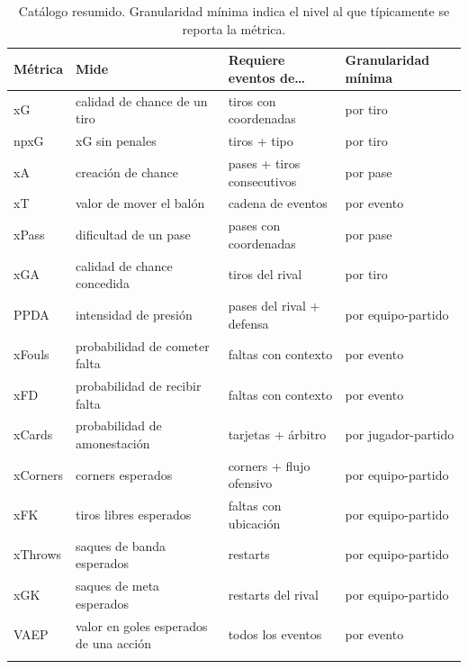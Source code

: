 \begin{longtable}{lp{5.5cm}p{4cm}p{2.5cm}}
\toprule
\textbf{Métrica} & \textbf{Mide} & \textbf{Requiere eventos de\ldots} & \textbf{Granularidad mínima} \\
\midrule
\endhead
xG       & calidad de chance de un tiro             & tiros con coordenadas      & por tiro \\
npxG     & xG sin penales                            & tiros + tipo               & por tiro \\
xA       & creación de chance                        & pases + tiros consecutivos & por pase \\
xT       & valor de mover el balón                   & cadena de eventos          & por evento \\
xPass    & dificultad de un pase                     & pases con coordenadas      & por pase \\
xGA      & calidad de chance concedida               & tiros del rival            & por tiro \\
PPDA     & intensidad de presión                     & pases del rival + defensa  & por equipo-partido \\
xFouls   & probabilidad de cometer falta             & faltas con contexto        & por evento \\
xFD      & probabilidad de recibir falta             & faltas con contexto        & por evento \\
xCards   & probabilidad de amonestación              & tarjetas + árbitro         & por jugador-partido \\
xCorners & corners esperados                         & corners + flujo ofensivo   & por equipo-partido \\
xFK      & tiros libres esperados                    & faltas con ubicación       & por equipo-partido \\
xThrows  & saques de banda esperados                 & restarts                   & por equipo-partido \\
xGK      & saques de meta esperados                  & restarts del rival         & por equipo-partido \\
VAEP     & valor en goles esperados de una acción   & todos los eventos          & por evento \\
\bottomrule
\caption{Catálogo resumido. Granularidad mínima indica el nivel al que típicamente se reporta la métrica.}
\end{longtable}
